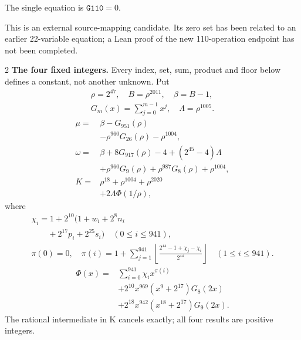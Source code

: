 \documentclass[10pt]{article}
\newcommand{\fl}[1]{\left\lfloor#1\right\rfloor}
\begin{document}
\noindent The single equation is $\boxed{\mathtt{G110}=0}$.
\par\medskip
This is an external source-mapping candidate. Its zero set has been related to
an earlier 22-variable equation; a Lean proof of the new 110-operation endpoint
has not been completed.
\bigskip
\begin{multicols}{2}\fontsize{7.7}{8.2}\selectfont
\textbf{The four fixed integers.}
Every index, set, sum, product and floor below defines a constant, not
another unknown. Put
\[
\begin{gathered}
\rho=2^{47},\quad B=\rho^{2011},\quad\beta=B-1,\\
G_m(x)=\sum_{j=0}^{m-1}x^j,\quad
\Lambda=\rho^{1005}.
\end{gathered}
\]
\begin{align*}
\mu={}&\beta-G_{951}(\rho)\\
&-\rho^{960}G_{26}(\rho)-\rho^{1004},\\
\omega={}&\beta+8G_{917}(\rho)-4+(2^{45}-4)\Lambda\\
&+\rho^{960}G_9(\rho)+\rho^{987}G_8(\rho)
  +\rho^{1004},\\
K={}&\rho^{18}+\rho^{1004}+\rho^{2020}\\
&+2\Lambda\Phi(1/\rho),
\end{align*}
where
\[
\begin{gathered}
\chi_i=1+2^{10}(1+w_i+2^8n_i\\
\qquad+2^{17}p_i+2^{25}s_i)\quad(0\le i\le941),\\
\pi(0)=0,\quad\pi(i)=1+\sum_{j=1}^{941}
\fl{\frac{2^{44}-1+\chi_j-\chi_i}{2^{44}}}\quad(1\le i\le941).
\end{gathered}
\]
\[
\begin{split}
\Phi(x)={}&\sum_{i=0}^{941}\chi_i x^{\pi(i)}\\
&+2^{10}x^{969}(x^9+2^{17})G_8(2x)\\
&+2^{18}x^{942}(x^{18}+2^{17})G_9(2x).
\end{split}
\]
The rational intermediate in K cancels exactly; all four results are positive integers.


\end{multicols}
\end{document}
